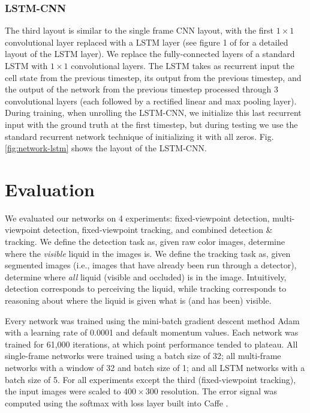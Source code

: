 \documentclass[runningheads,a4paper]{llncs}
\begin{document}
\vspace{-0.5cm}
\subsubsection{LSTM-CNN} 

The third layout is similar to the single frame CNN layout, with the first $1 \times 1$ convolutional layer replaced with a LSTM layer (see figure 1 of \cite{greff2015} for a detailed layout of the LSTM layer). We replace the fully-connected layers of a standard LSTM with $1 \times 1$ convolutional layers. The LSTM takes as recurrent input the cell state from the previous timestep, its output from the previous timestep, and the output of the network from the previous timestep processed through 3 convolutional layers (each followed by a rectified linear and max pooling layer). During training, when unrolling the LSTM-CNN, we initialize this last recurrent input with the ground truth at the first timestep, but during testing we use the standard recurrent network technique of initializing it with all zeros. Fig. \ref{fig:network-lstm} shows the layout of the LSTM-CNN. 

\vspace{-0.5cm}
\section{Evaluation}
\label{sec:evaluation}
\vspace{-0.3cm}

We evaluated our networks on 4 experiments: fixed-viewpoint detection, multi-viewpoint detection, fixed-viewpoint tracking, and combined detection \& tracking. We define the detection task as, given raw color images, determine where the {\it visible} liquid in the images is. We define the tracking task as, given segmented images (i.e., images that have already been run through a detector), determine where {\it all} liquid (visible and occluded) is in the image. Intuitively, detection corresponds to perceiving the liquid, while tracking corresponds to reasoning about where the liquid is given what is (and has been) visible.

Every network was trained  using the mini-batch gradient descent method Adam \cite{kingma2014} with a learning rate of 0.0001 and default momentum values. Each network was trained for 61,000 iterations, at which point performance tended to plateau. All single-frame networks were trained using a batch size of 32; all multi-frame networks with a window of 32 and batch size of 1; and all LSTM networks with a batch size of 5. For all experiments except the third (fixed-viewpoint tracking), the input images were scaled to $400 \times 300$ resolution. The error signal was computed using the softmax with loss layer built into Caffe \cite{jia2014}.
\end{document}
